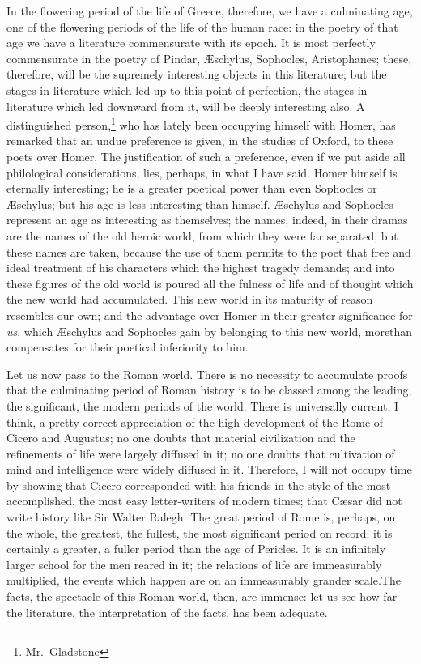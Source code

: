 In the flowering period of the life of Greece, therefore, we have a
culminating age, one of the flowering periods of the life of the human
race: in the poetry of that age we have a literature commensurate with
its epoch. It is most perfectly commensurate in the poetry of Pindar,
Æschylus, Sophocles, Aristophanes; these, therefore, will be the
supremely interesting objects in this literature; but the stages in
literature which led up to this point of perfection, the stages in
literature which led downward from it, will be deeply interesting also.
A distinguished person,\footnote{Mr.~Gladstone} who has lately been
occupying himself with Homer, has remarked that an undue preference is
given, in the studies of Oxford, to these poets over Homer. The
justification of such a preference, even if we put aside all
philological considerations, lies, perhaps, in what I have said. Homer
himself is eternally interesting; he is a greater poetical power than
even Sophocles or Æschylus; but his age is less interesting than
himself. Æschylus and Sophocles represent an age as interesting as
themselves; the names, indeed, in their dramas are the names of the old
heroic world, from which they were far separated; but these names are
taken, because the use of them permits to the poet that free and ideal
treatment of his characters which the highest tragedy demands; and into
these figures of the old world is poured all the fulness of life and of
thought which the new world had accumulated. This new world in its
maturity of reason resembles our own; and the advantage over Homer in
their greater significance for \emph{us}, which Æschylus and Sophocles
gain by belonging to this new world, morethan compensates for their
poetical inferiority to him.

Let us now pass to the Roman world. There is no necessity to accumulate
proofs that the culminating period of Roman history is to be classed
among the leading, the significant, the modern periods of the world.
There is universally current, I think, a pretty correct appreciation of
the high development of the Rome of Cicero and Augustus; no one doubts
that material civilization and the refinements of life were largely
diffused in it; no one doubts that cultivation of mind and intelligence
were widely diffused in it. Therefore, I will not occupy time by showing
that Cicero corresponded with his friends in the style of the most
accomplished, the most easy letter-writers of modern times; that Cæsar
did not write history like Sir Walter Ralegh. The great period of Rome
is, perhaps, on the whole, the greatest, the fullest, the most
significant period on record; it is certainly a greater, a fuller period
than the age of Pericles. It is an infinitely larger school for the men
reared in it; the relations of life are immeasurably multiplied, the
events which happen are on an immeasurably grander scale.The facts, the
spectacle of this Roman world, then, are immense: let us see how far the
literature, the interpretation of the facts, has been adequate.

